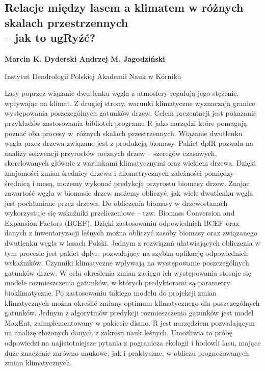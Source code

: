 \documentclass[\main/boa.tex]{subfiles}
\begin{document}
\subsection[Relacje między lasem a klimatem w różnych skalach przestrzennych – jak to ugRyźć?]{Relacje między lasem a klimatem w różnych skalach przestrzennych \\ – jak to ugRyźć?}

\begin{minipage}{0.915\textwidth}
	\centering
  {\bf {} Marcin K. Dyderski  Andrzej M. Jagodziński}
\end{minipage}


\begin{affiliations}
\begin{minipage}{0.915\textwidth}
\centering
Instytut Dendrologii Polskiej Akademii Nauk w Kórniku  \\[-2pt]
\end{minipage}
\end{affiliations}

\vskip 0.3cm

Lasy poprzez wiązanie dwutlenku węgla z atmosfery regulują jego stężenie, wpływając na klimat. Z drugiej strony, warunki klimatyczne wyznaczają granice występowania poszczególnych gatunków drzew. Celem prezentacji jest pokazanie przykładów zastosowania bibliotek programu R jako narzędzi które pomagają poznać oba procesy w~różnych skalach przestrzennych. Wiązanie dwutlenku węgla przez drzewa związane jest z produkcją biomasy. Pakiet dplR pozwala na analizy sekwencji przyrostów rocznych drzew – szeregów czasowych, skorelowanych głównie z warunkami klimatycznymi oraz wiekiem drzewa. Dzięki znajomości zmian średnicy drzewa i allometrycznych zależności pomiędzy średnicą i masą, możemy wykonać predykcję przyrostu biomasy drzew. Znając zawartość węgla w biomasie drzew możemy obliczyć, jak wiele dwutlenku węgla jest pochłaniane przez drzewa. Do obliczenia biomasy w drzewostanach wykorzystuje się wskaźniki przeliczeniowe – tzw. Biomass Conversion and Expansion Factors (BCEF). Dzięki zastosowaniu odpowiednich BCEF oraz danych z inwentaryzacji leśnych można obliczyć zasoby biomasy oraz związanego dwutlenku węgla w lasach Polski. Jednym z rozwiązań ułatwiających obliczenia w tym procesie jest pakiet dplyr, pozwalający na szybką aplikację odpowiednich wskaźników. Czynniki klimatyczne wpływają na występowanie poszczególnych gatunków drzew. W celu określenia zmian zasięgu ich występowania stosuje się modele rozmieszczenia gatunków, w których predyktorami są parametry bioklimatyczne. Po zastosowaniu takiego modelu do projekcji zmian klimatycznych można określić zmiany optimum klimatycznego dla poszczególnych gatunków. Jednym z algorytmów predykcji rozmieszczenia gatunków jest model MaxEnt, zaimplementowany w pakiecie dismo. R jest narzędziem pozwalającym na analizę złożonych danych z zakresu nauk leśnych. Umożliwia to próbę odpowiedzi na najistotniejsze pytania z pogranicza ekologii i hodowli lasu, mające duże znaczenie zarówno naukowe, jak i praktyczne, w obliczu prognozowanych zmian klimatycznych. 
\end{document}
